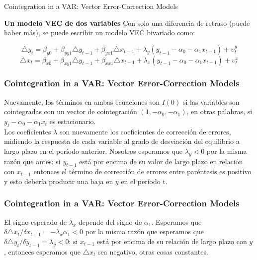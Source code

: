 \documentclass[spanish,xcolor=table]{beamer}
\begin{document}
\begin{section}{Cointegration in a VAR: Vector Error-Correction Models}
\begin{frame}
\textbf{Un modelo VEC de dos variables}
Con solo una diferencia de retraso (puede haber m\'as), se puede escribir un modelo VEC bivariado como:

\begin{equation}
\triangle y_t = \beta_{y0} + \beta_{yy1} \triangle y_{t-1} + \beta_{yx1} \triangle x_{t-1} + \lambda_y (y_{t-1} - \alpha_0 - \alpha_1 x_{t-1} ) + \upsilon^y_t
\end{equation}
\begin{equation}
\triangle x_t = \beta_{x0} + \beta_{xy1} \triangle y_{t-1} + \beta_{xx1} \triangle x_{t-1} + \lambda_x (y_{t-1} - \alpha_0 - \alpha_1 x_{t-1} ) + \upsilon^x_t
\end{equation}

\end{frame}

\begin{frame}
\frametitle{Cointegration in a VAR: Vector Error-Correction Models}


Nuevamente, los t\'erminos en ambas ecuaciones son $I(0)$ si las variables son
cointegradas con un vector de cointegraci\'on $(1, - \alpha_0, - \alpha_1)$, en otras palabras, si $y_t - \alpha_0 - \alpha_1x_t$ es estacionario.\\
\vspace{4mm}	
Los coeficientes $\lambda$ son nuevamente los coeficientes de correcci\'on de errores, midiendo la respuesta de cada variable al grado de desviaci\'on del equilibrio a largo plazo en el per\'{i}odo anterior. Nosotros esperamos que $\lambda_y < 0$ por la misma raz\'on que antes: si $y_{t -1}$ est\'a por encima de su valor de largo plazo en relaci\'on con $x_{t -1}$ entonces el t\'ermino de correcci\'on de errores entre par\'entesis es positivo y esto deber\'{i}a producir una baja en $y$ en el per\'{i}odo t. 

\end{frame}
\end{section}

\begin{frame}
\frametitle{Cointegration in a VAR: Vector Error-Correction Models}


El signo esperado de $\lambda_x$ depende del signo de $\alpha_1$. Esperamos que $ \delta \triangle x_t / \delta x_{t-1} = - \lambda_x \alpha_1 < 0$ por la misma raz\'on que esperamos que $\delta \triangle y_t / \delta y_{t-1} = \lambda_y < 0$: si $x_{t-1}$ est\'a por encima de su relaci\'on de largo plazo con $y$, entonces esperamos que $\triangle x_t$ sea negativo, otras cosas constantes.

\end{frame}
\end{document}
